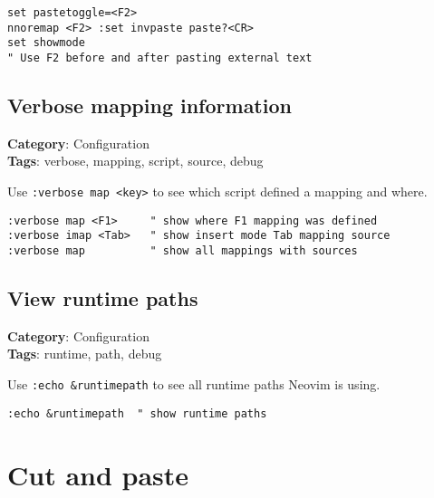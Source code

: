 {{{{\begin{Exa*}{}
\begin{Verbatim}[fontsize=\footnotesize, breaklines, breakanywhere]
set pastetoggle=<F2>
nnoremap <F2> :set invpaste paste?<CR>
set showmode
" Use F2 before and after pasting external text
\end{Verbatim}
\end{Exa*}

\section{Verbose mapping information}

\textbf{Category}: Configuration\\ \textbf{Tags}: verbose, mapping, script, source, debug
\vspace{0.5cm}

Use {\footnotesize \Verb§:verbose map <key>§} to see which script defined a mapping and where.

\begin{Exa*}{}
\begin{Verbatim}[fontsize=\footnotesize, breaklines, breakanywhere]
:verbose map <F1>     " show where F1 mapping was defined
:verbose imap <Tab>   " show insert mode Tab mapping source
:verbose map          " show all mappings with sources
\end{Verbatim}
\end{Exa*}

\section{View runtime paths}

\textbf{Category}: Configuration\\ \textbf{Tags}: runtime, path, debug
\vspace{0.5cm}

Use {\footnotesize \Verb§:echo &runtimepath§} to see all runtime paths Neovim is using.

\begin{Exa*}{}
\begin{Verbatim}[fontsize=\footnotesize, breaklines, breakanywhere]
:echo &runtimepath  " show runtime paths
\end{Verbatim}
\end{Exa*}

\chapter{Cut and paste}
}}}}
